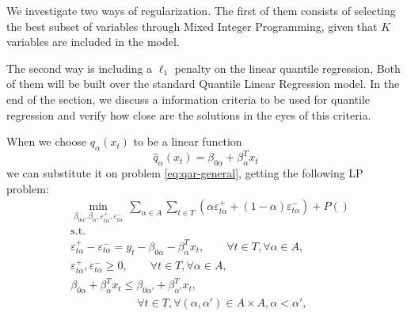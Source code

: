 We investigate two ways of regularization.
The first of them consists of selecting the best subset of variables through Mixed Integer Programming, given that $K$ variables are included in the model. 

The second way is including a $\ell_1$ penalty on the linear quantile regression, 
Both of them will be built over the standard Quantile Linear Regression model. In the end of the section, we discuss a information criteria to be used for quantile regression and verify how close are the solutions in the eyes of this criteria.

When we choose $q_\alpha(x_t)$ to be a linear function
\begin{equation}
\hat{q}_\alpha(x_t) = \beta_{0\alpha} + \beta_\alpha^T x_t 
\end{equation}
we can substitute it on problem \ref{eq:qar-general}, getting the following LP problem:
\begin{align}
&\min_{\beta_{0\alpha},\beta_\alpha,\varepsilon_{t\alpha}^{+}, \varepsilon_{t\alpha}^{-}} \, \sum_{\alpha \in A} \sum_{t \in T}\left(\alpha \varepsilon_{t \alpha}^{+}+(1-\alpha)\varepsilon_{t \alpha}^{-}\right) \label{eq:linear-opt-1} + P() \\
&\mbox{s.t. } \\
&\varepsilon_{t \alpha}^{+}-\varepsilon_{t \alpha}^{-}=y_{t} - \beta_{0\alpha} - \beta_{\alpha}^T x_{t}, \qquad  \forall t \in T,\forall \alpha \in A, \\
 &\varepsilon_{t\alpha}^+,\varepsilon_{t\alpha}^- \geq 0, \qquad    \forall t \in T,\forall \alpha \in A,\\ 
 &
 \beta_{0\alpha} + \beta_{\alpha}^T x_{t} \leq \beta_{0\alpha'} + \beta_{\alpha'}^T x_{t}, \nonumber \\
& \label{eq:linear-opt-ult} \qquad \qquad \qquad \forall t \in T, \forall (\alpha, \alpha') \in A \times A,  \alpha < \alpha',
 \end{align}
	
	
	

